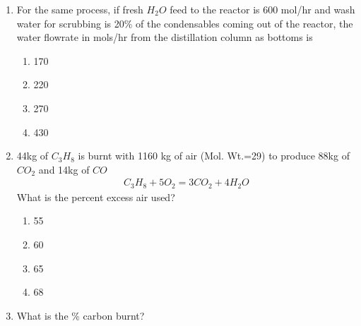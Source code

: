 \documentclass[journal,12pt,onecolumn]{IEEEtran}
\theoremstyle{remark}
\begin{document}
\begin{enumerate}
The reaction is: $C_2H_4\brak{g}+H_2O\brak{g}\to C_2H_5OH\brak{g}$

For an azeotrope product rate of 500 mols/hr, the recycle gas flowrate in mols/hr is 

\begin{multicols}{4}
    \begin{enumerate}
        \item 30
        \item 420
        \item 1020
        \item 1500
    \end{enumerate}
\end{multicols}

    \item For the same process, if fresh $H_2O$ feed to the reactor is 600 mol/hr and wash water for scrubbing is 20\% of the condensables coming out of the reactor, the water flowrate in mols/hr from the distillation column as bottoms is 

    \begin{multicols}{4}
        \begin{enumerate}
            \item 170
            \item 220
            \item 270
            \item 430
        \end{enumerate}
    \end{multicols}
\newpage
    \item 44kg of $C_3H_8$ is burnt with 1160 kg of air (Mol. Wt.=29) to produce 88kg of $CO_2$ and 14kg of $CO$
    \begin{align*}
        C_3H_8+5O_2=3CO_2+4H_2O
    \end{align*}
    What is the percent excess air used?

    \begin{multicols}{4}
        \begin{enumerate}
            \item 55
            \item 60
            \item 65
            \item 68
        \end{enumerate}
    \end{multicols}

    \item What is the \% carbon burnt?


\end{enumerate}
\end{document}
